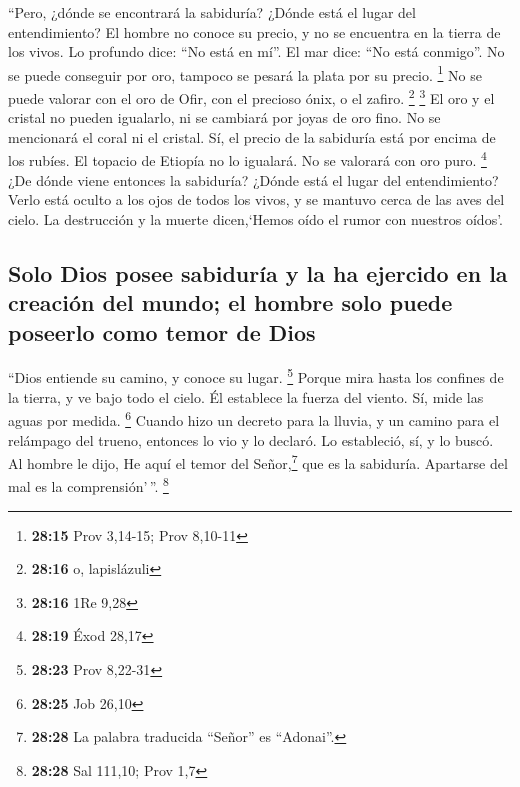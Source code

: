  ``Pero, ¿dónde se encontrará la sabiduría? ¿Dónde está
el lugar del entendimiento?  El hombre no conoce su
precio, y no se encuentra en la tierra de los vivos.  Lo
profundo dice: ``No está en mí''. El mar dice: ``No está conmigo''.
 No se puede conseguir por oro, tampoco se pesará la
plata por su precio. \footnote{\textbf{28:15} Prov 3,14-15; Prov 8,10-11}
 No se puede valorar con el oro de Ofir, con el precioso
ónix, o el zafiro. \footnote{\textbf{28:16} o, lapislázuli} \footnote{\textbf{28:16}
  1Re 9,28}  El oro y el cristal no pueden igualarlo, ni
se cambiará por joyas de oro fino.  No se mencionará el
coral ni el cristal. Sí, el precio de la sabiduría está por encima de
los rubíes.  El topacio de Etiopía no lo igualará. No se
valorará con oro puro. \footnote{\textbf{28:19} Éxod 28,17}
 ¿De dónde viene entonces la sabiduría? ¿Dónde está el
lugar del entendimiento?  Verlo está oculto a los ojos de
todos los vivos, y se mantuvo cerca de las aves del cielo.
 La destrucción y la muerte dicen,`Hemos oído el rumor
con nuestros oídos'.

\hypertarget{solo-dios-posee-sabiduruxeda-y-la-ha-ejercido-en-la-creaciuxf3n-del-mundo-el-hombre-solo-puede-poseerlo-como-temor-de-dios}{%
\subsection{Solo Dios posee sabiduría y la ha ejercido en la creación
del mundo; el hombre solo puede poseerlo como temor de
Dios}\label{solo-dios-posee-sabiduruxeda-y-la-ha-ejercido-en-la-creaciuxf3n-del-mundo-el-hombre-solo-puede-poseerlo-como-temor-de-dios}}

 ``Dios entiende su camino, y conoce su lugar.
\footnote{\textbf{28:23} Prov 8,22-31}  Porque mira hasta
los confines de la tierra, y ve bajo todo el cielo.  Él
establece la fuerza del viento. Sí, mide las aguas por medida.
\footnote{\textbf{28:25} Job 26,10}  Cuando hizo un
decreto para la lluvia, y un camino para el relámpago del trueno,
 entonces lo vio y lo declaró. Lo estableció, sí, y lo
buscó.  Al hombre le dijo, He aquí el temor del
Señor,\footnote{\textbf{28:28} La palabra traducida ``Señor'' es
  ``Adonai''.} que es la sabiduría. Apartarse del mal es la
comprensión'\,''. \footnote{\textbf{28:28} Sal 111,10; Prov 1,7}


